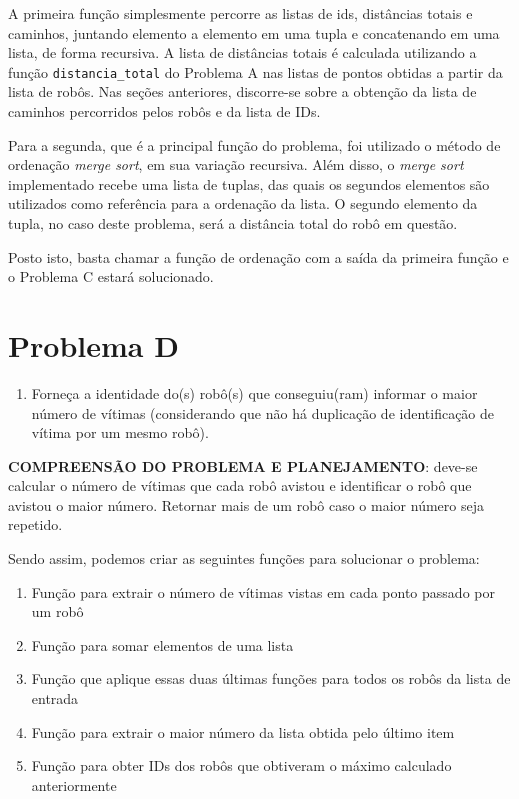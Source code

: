 A primeira função simplesmente percorre as listas de ids, distâncias totais e caminhos, juntando elemento a elemento em uma tupla e concatenando em uma lista, de forma recursiva. A lista de distâncias totais é calculada utilizando a função \texttt{distancia\_total} do Problema A nas listas de pontos obtidas a partir da lista de robôs. Nas seções anteriores, discorre-se sobre a obtenção da lista de caminhos percorridos pelos robôs e da lista de IDs.

Para a segunda, que é a principal função do problema, foi utilizado o método de ordenação \textit{merge sort}, em sua variação recursiva. Além disso, o \textit{merge sort} implementado recebe uma lista de tuplas, das quais os segundos elementos são utilizados como referência para a ordenação da lista. O segundo elemento da tupla, no caso deste problema, será a distância total do robô em questão.

Posto isto, basta chamar a função de ordenação com a saída da primeira função e o Problema C estará solucionado.

\section{Problema D}\label{problemaD}

\begin{enumerate}[label=\textbf{\alph*)},resume*=problemas]
\item Forneça a identidade do(s) robô(s) que conseguiu(ram) informar o maior número de vítimas (considerando que não há duplicação de identificação de vítima por um mesmo robô).
\end{enumerate}

\noindent \textbf{COMPREENSÃO DO PROBLEMA E PLANEJAMENTO}: deve-se calcular o número de vítimas que cada robô avistou e identificar o robô que avistou o maior número.
Retornar mais de um robô caso o maior número seja repetido.

Sendo assim, podemos criar as seguintes funções para solucionar o problema:
\begin{enumerate}
    \item Função para extrair o número de vítimas vistas em cada ponto passado por um robô
    \item Função para somar elementos de uma lista  
    \item Função que aplique essas duas últimas funções para todos os robôs da lista de entrada  
    \item Função para extrair o maior número da lista obtida pelo último item  
    \item Função para obter IDs dos robôs que obtiveram o máximo calculado anteriormente
\end{enumerate}

